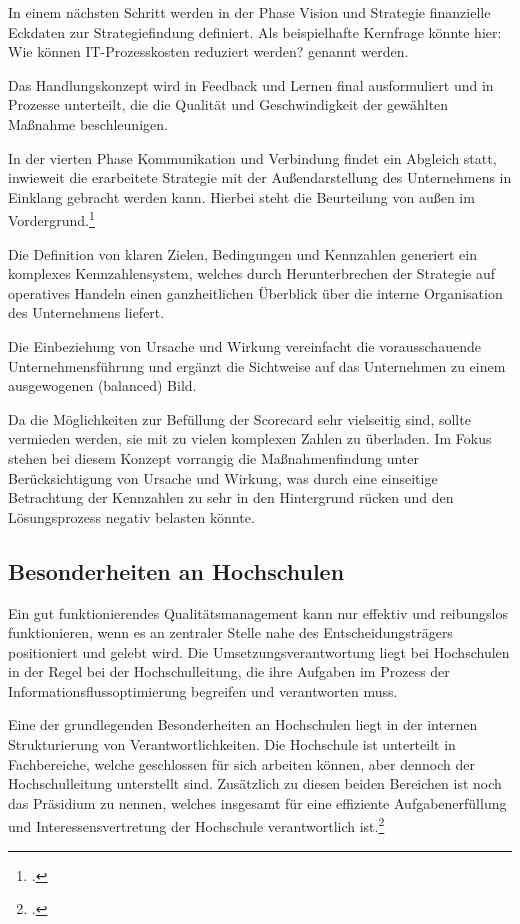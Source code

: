 In einem nächsten Schritt werden in der Phase \glqq Vision und Strategie\grqq{} finanzielle Eckdaten zur 
Strategiefindung definiert. Als beispielhafte Kernfrage könnte hier: \glqq Wie können IT-Prozesskosten reduziert werden?\grqq{} genannt werden.

Das Handlungskonzept wird in \glqq Feedback und Lernen\grqq{} final ausformuliert und in Prozesse 
unterteilt, die die Qualität und Geschwindigkeit der gewählten Maßnahme beschleunigen.

In der vierten Phase \glqq Kommunikation und Verbindung\grqq{} findet ein Abgleich statt, inwieweit die 
erarbeitete Strategie mit der Außendarstellung des Unternehmens in Einklang gebracht werden kann. Hierbei 
steht die Beurteilung von außen im Vordergrund.\footcite[35 ff.]{kaufmann_feinschliff_2002}

Die Definition von klaren Zielen, Bedingungen und Kennzahlen generiert ein komplexes 
Kennzahlensystem, welches durch Herunterbrechen der Strategie auf operatives Handeln einen 
ganzheitlichen Überblick über die interne Organisation des Unternehmens liefert.

Die Einbeziehung von Ursache und Wirkung vereinfacht die vorausschauende Unternehmensführung 
und ergänzt die Sichtweise auf das Unternehmen zu einem ausgewogenen (balanced) Bild. 

Da die Möglichkeiten zur Befüllung der Scorecard sehr vielseitig sind, sollte vermieden werden, sie mit zu 
vielen komplexen Zahlen zu überladen. Im Fokus stehen bei diesem Konzept vorrangig die 
Maßnahmenfindung unter Berücksichtigung von Ursache und Wirkung, was durch eine einseitige Betrachtung 
der Kennzahlen zu sehr in den Hintergrund rücken und den Lösungsprozess negativ belasten könnte.

\subsection{Besonderheiten an Hochschulen}
Ein gut funktionierendes Qualitätsmanagement kann nur effektiv und reibungslos funktionieren, wenn es an zentraler Stelle nahe des Entscheidungsträgers positioniert und gelebt wird.
Die Umsetzungsverantwortung liegt bei Hochschulen in der Regel bei der Hochschulleitung, die ihre Aufgaben im Prozess der Informationsflussoptimierung begreifen und verantworten muss.

Eine der grundlegenden Besonderheiten an Hochschulen liegt in der internen Strukturierung von Verantwortlichkeiten. Die Hochschule ist unterteilt in Fachbereiche, welche geschlossen für sich arbeiten können, aber dennoch der Hochschulleitung unterstellt sind. Zusätzlich zu diesen beiden Bereichen ist noch das Präsidium zu nennen, welches insgesamt für eine effiziente Aufgabenerfüllung und Interessensvertretung der Hochschule verantwortlich ist.\footcite[353 ff.]{mintzberg_1992}

